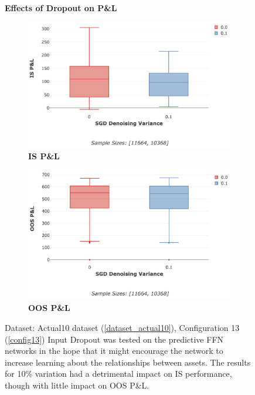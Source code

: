 \documentclass[a4paper,11pt,oneside]{article}
\theoremstyle{plain}
\theoremstyle{definition}
\begin{document}
	\begin{figure}[H]
		\centering
		\textbf{Effects of Dropout on P\&L}
				\begin{subfigure}{.5\textwidth}
			\centering 
			\includegraphics[scale=0.305]{images/results/8_6_complexity/is_actual_pl_masking.png}
			\caption{\textbf{IS P\&L} }
			\label{figure-is_actual_pl_masking}
		\end{subfigure}%
		\begin{subfigure}{.5\textwidth}
			\centering 
			\includegraphics[scale=0.3]{images/results/8_6_complexity/oos_actual_pl_masking.png}
			\caption{\textbf{OOS P\&L} }
			\label{figure-oos_actual_pl_masking}
		\end{subfigure}
		\caption[Effects of Dropout on P\&L]{Dataset: Actual10 dataset (\ref{dataset_actual10}), Configuration 13 (\ref{config13})
			\newline Input Dropout was tested on the predictive FFN networks in the hope that it might encourage the network to increase learning about the relationships between assets. The results for 10\% variation had a detrimental impact on IS performance, though with little impact on OOS P\&L.}
		\label{figure-actual_pl_masking}
	\end{figure}
		
\end{document}
